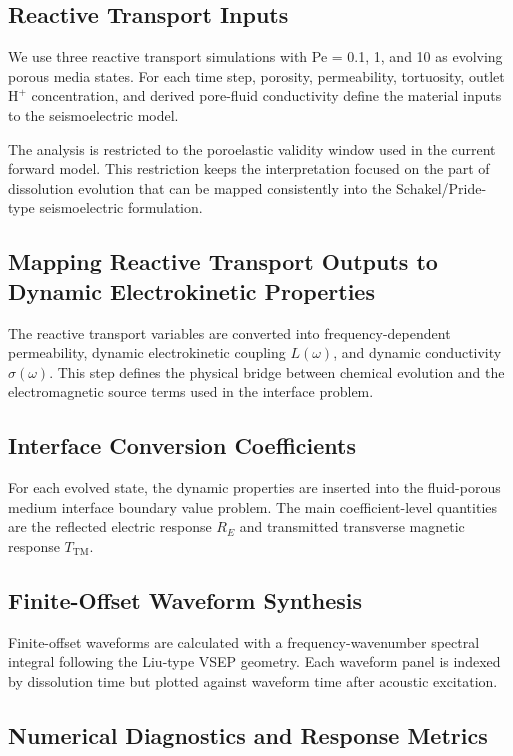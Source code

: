 \documentclass[draft]{agujournal2019}
\begin{document}
\subsection{Reactive Transport Inputs}

We use three reactive transport simulations with Pe = 0.1, 1, and 10 as evolving porous media states.
For each time step, porosity, permeability, tortuosity, outlet $\mathrm{H}^+$ concentration, and derived pore-fluid conductivity define the material inputs to the seismoelectric model.

The analysis is restricted to the poroelastic validity window used in the current forward model.
This restriction keeps the interpretation focused on the part of dissolution evolution that can be mapped consistently into the Schakel/Pride-type seismoelectric formulation.

\subsection{Mapping Reactive Transport Outputs to Dynamic Electrokinetic Properties}

The reactive transport variables are converted into frequency-dependent permeability, dynamic electrokinetic coupling $L(\omega)$, and dynamic conductivity $\sigma(\omega)$.
This step defines the physical bridge between chemical evolution and the electromagnetic source terms used in the interface problem.

\subsection{Interface Conversion Coefficients}

For each evolved state, the dynamic properties are inserted into the fluid-porous medium interface boundary value problem.
The main coefficient-level quantities are the reflected electric response $R_E$ and transmitted transverse magnetic response $T_{\mathrm{TM}}$.

\subsection{Finite-Offset Waveform Synthesis}

Finite-offset waveforms are calculated with a frequency-wavenumber spectral integral following the Liu-type VSEP geometry.
Each waveform panel is indexed by dissolution time but plotted against waveform time after acoustic excitation.

\subsection{Numerical Diagnostics and Response Metrics}
\end{document}
